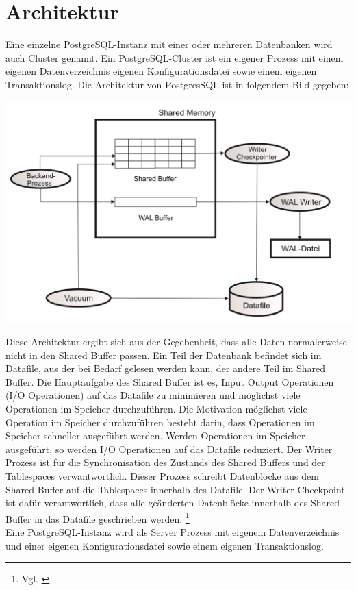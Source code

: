 \section{Architektur}
Eine einzelne PostgreSQL-Instanz mit einer oder mehreren Datenbanken wird auch Cluster genannt. Ein PostgreSQL-Cluster ist ein eigener Prozess mit einem eigenen Datenverzeichnis eigenen Konfigurationsdatei sowie einem eigenen Transaktionslog.
Die Architektur von PostgresSQL ist in folgendem Bild gegeben:
\begin{center}
    \includegraphics[width = \linewidth]{./images/PostgresSQLArchitektur.jpg}
\end{center}
Diese Architektur ergibt sich aus der Gegebenheit, dass alle Daten normalerweise nicht in den Shared Buffer passen. Ein Teil der Datenbank befindet sich im Datafile, aus der bei Bedarf gelesen werden kann, der andere Teil im Shared Buffer.
Die Hauptaufgabe des Shared Buffer ist es, Input Output Operationen (I/O Operationen) auf das Datafile zu minimieren und möglichst viele Operationen im Speicher durchzuführen. Die Motivation möglichst viele Operation im Speicher durchzuführen
besteht darin, dass Operationen im Speicher schneller ausgeführt werden. Werden Operationen im Speicher ausgeführt, so werden I/O Operationen auf das Datafile reduziert. Der Writer Prozess ist für die Synchronisation
des Zustands des Shared Buffers und der Tablespaces verwantwortlich. Dieser Prozess schreibt Datenblöcke aus dem Shared Buffer auf die Tablespaces innerhalb des Datafile. Der Writer Checkpoint ist dafür verantwortlich,
dass alle geänderten Datenblöcke innerhalb des Shared Buffer in das Datafile geschrieben werden. \footnote{Vgl. \cite[Seite 26]{froehlich01}} \\
Eine PostgreSQL-Instanz wird als Server Prozess mit eigenem Datenverzeichnis und einer eigenen Konfigurationsdatei sowie einem eigenen Transaktionslog.
